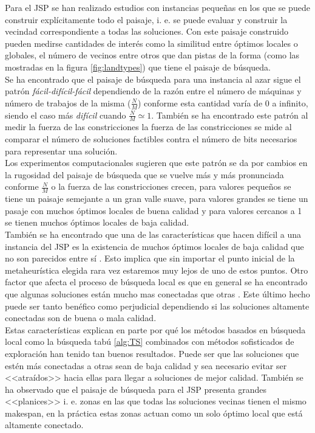 Para el JSP se han realizado estudios con instancias pequeñas en los que se puede construir explícitamente todo el paisaje, i. e. se puede evaluar y construir la vecindad correspondiente a todas las soluciones. Con este paisaje construido pueden medirse cantidades de interés como la similitud entre óptimos locales o globales, el número de vecinos entre otros que dan pistas de la forma (como las mostradas en la figura \ref{fig:landtypes}) que tiene el paisaje de búsqueda.\\

Se ha encontrado que el paisaje de búsqueda para una instancia al azar sigue el patrón \textit{fácil-difícil-fácil} dependiendo de la razón entre el número de máquinas y número de trabajos de la misma\cite{Streeter2006}  ($\frac{N}{M}$) conforme esta cantidad  varía de 0 a infinito, siendo el caso más \textit{difícil} cuando $\frac{N}{M}\simeq 1$. También se ha encontrado este patrón al medir la fuerza de las constricciones la fuerza de las constricciones se mide al comparar el número de soluciones factibles contra el número de bits necesarios para representar una solución\cite{beck1997constrainedness}.\\

Los experimentos computacionales sugieren que este patrón se da por cambios en la rugosidad del paisaje de búsqueda que se vuelve más y más pronunciada conforme $\frac{N}{M}$ o la fuerza de las constricciones crecen, para valores pequeños se tiene un paisaje semejante a un gran valle suave, para valores grandes se tiene un pasaje con muchos óptimos locales de buena calidad y para valores cercanos a 1 se tienen muchos óptimos locales de baja calidad.\\


También se ha encontrado que una de las características que hacen difícil a una instancia del JSP es la existencia de muchos óptimos locales de baja calidad que no son parecidos entre sí \cite{mattfeld1999search}. Esto implica que sin importar el punto inicial de la metaheurística elegida rara vez estaremos muy lejos de uno de estos puntos. Otro factor que afecta el proceso de búsqueda local es que en general se ha encontrado que algunas soluciones están mucho mas conectadas que otras \cite{bierwirth2004landscape}. Este último hecho puede ser tanto benéfico como perjudicial dependiendo si las soluciones altamente conectadas son de buena o mala calidad. \\


Estas características explican en parte por qué los métodos basados en búsqueda local como la búsqueda tabú \ref{alg:TS} combinados con métodos sofisticados de exploración han tenido tan buenos resultados\cite{watson2003problem}. Puede ser que las soluciones que estén más conectadas a otras sean de baja calidad y sea necesario evitar ser <<atraídos>> hacia ellas para llegar a soluciones de mejor calidad. También se ha observado que el paisaje de búsqueda para el JSP presenta grandes <<planices>> i. e. zonas en las que todas las soluciones vecinas tienen el mismo makespan, en la práctica estas zonas actuan como un solo óptimo local que está altamente conectado.

